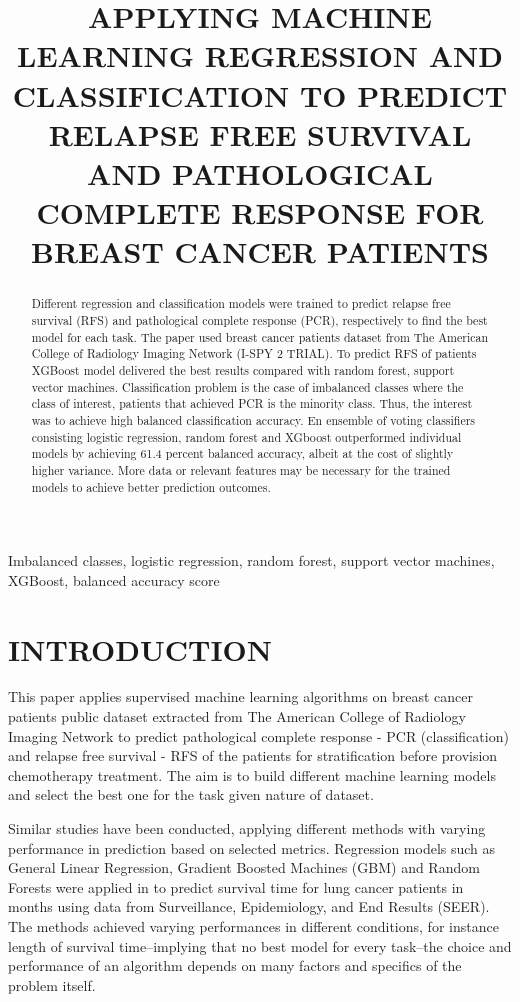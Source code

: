 \documentclass{article}
\title{APPLYING MACHINE LEARNING REGRESSION AND CLASSIFICATION TO PREDICT RELAPSE FREE SURVIVAL AND PATHOLOGICAL COMPLETE RESPONSE FOR BREAST CANCER PATIENTS}
\begin{document}
%
\maketitle
%
\begin{abstract}
	Different regression and classification models were trained to predict relapse free survival (RFS) and pathological complete response (PCR), respectively to find the best model for each task. The paper used breast cancer patients dataset from  The American College of Radiology Imaging Network (I-SPY 2 TRIAL). To predict RFS of patients XGBoost model delivered the best results compared with random forest, support vector machines. Classification problem is the case of imbalanced classes where the class of interest, patients that achieved PCR is the minority class. Thus, the interest was to achieve high balanced classification accuracy. En ensemble of voting classifiers consisting logistic regression, random forest and XGboost outperformed individual models by achieving 61.4 percent balanced accuracy, albeit at the cost of slightly higher variance. More data or relevant features may be necessary for the trained models to achieve better prediction outcomes. 
\end{abstract}
%
\begin{keywords}
	Imbalanced classes, logistic regression, random forest, support vector machines, XGBoost, balanced accuracy score
\end{keywords}
%
\section{INTRODUCTION}
\label{sec:intro}
This paper applies supervised machine learning algorithms on breast cancer patients public dataset extracted from The American College of Radiology Imaging Network to predict pathological complete response - PCR (classification) and relapse free survival - RFS of the patients for stratification before provision chemotherapy treatment. The aim is to build different machine learning models and select the best one for the task given nature of dataset. 

Similar studies have been conducted, applying different methods with varying performance in prediction based on selected metrics. Regression models such as General Linear Regression, Gradient Boosted Machines (GBM) and Random Forests were applied in  \cite{bartholomai2018lung} to predict survival time for lung cancer patients in months using data from Surveillance, Epidemiology, and End 
Results (SEER). The methods achieved varying performances in different conditions, for instance length of survival time--implying that no best model for every task--the choice and performance of an algorithm depends on many factors and specifics of the problem itself.
\end{document}
